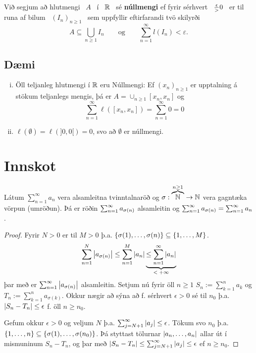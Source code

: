 \documentclass[12pt]{report}
\begin{document}
\begin{skgr*}
Við segjum að hlutmengi \ $A$ \ í \ $\mathbb{R}$ \ sé {\bf núllmengi} ef fyrir sérhvert \ $\frac{\epsilon} > 0$ \ er til runa af bilum \ $(I_n)_{n\geq 1}$ \ sem uppfyllir eftirfarandi tvö skilyrði
\[
A\subseteq\bigcup_{n\geq 1}I_n\qquad\text{og}\qquad \sum_{n=1}^{\infty}l(I_n) < \varepsilon.
\]
\end{skgr*}

\subsection{Dæmi}

\begin{daemi}
\begin{enumerate}[i)]
\item Öll teljanleg hlutmengi í $\mathbb{R}$ eru Núllmengi: Ef
  $(x_n)_{n \geq 1}$ er upptalning á stökum teljanlegs mengis, þá er
  $A = \cup_{n \geq 1} [x_n, x_n]$ og
  \[\sum_{n = 1}^{\infty} \ell([x_n,x_n]) = \sum_{n=1}^{\infty} 0 = 0\]
\item $\ell(\emptyset) = \ell(]0,0[) = 0$, svo að $\emptyset$ er
  núllmengi.
\end{enumerate}
\end{daemi}

\section*{Innskot}

\begin{setn}
  Látum $\sum_{n=1}^{\infty}a_n$ vera alsamleitna tvinntalnaröð og
  $\sigma: \overbrace{\mathbb{N}}^{n \geq 1} \to \mathbb{N}$ vera gagntæka vörpun
  (umröðun). Þá er röðin $\sum_{n = {1}}^{\infty} a_{\sigma(n)}$ alsamleitin og
  $\sum_{n = {1}}^{\infty} a_{\sigma(n)} = \sum_{n = 1}^{\infty} a_n$.
\end{setn}

\begin{proof}
  Fyrir $N > 0$ er til $M > 0$ þ.a.
  $\{\sigma(1), \dotsc, \sigma(n)\} \subseteq \{1, \dotsc, M\}$.
  \[\sum_{n=1}^{N} \left|a_{\sigma(n)}\right|
  \leq \sum_{n = 1}^M \left|a_n\right| \underbrace{\leq \sum_{n = {1}}^{\infty}
    \left|a_n\right|}_{\text{$< +\infty$}}
  \]
  þar með er $\sum_{n = 1}^{\infty} \left|a_{\sigma(n)}\right|$ alsamleitin.  Setjum nú
  fyrir öll $n \geq 1$ $S_n := \sum_{k=1}^n a_k$ og
  $T_n := \sum_{k=1}^n a_{\sigma(k)}$.  Okkur nægir að sýna að
  f. sérhvert $\epsilon > 0$ sé til $n_0$ þ.a.
  $\left|S_n - T_n\right| \leq \epsilon$ f. öll $n \geq n_0$.

  Gefum okkur $\epsilon > 0$ og veljum $N$ þ.a.
  $\sum_{j = N+1}^{\infty} \left|a_j\right| \leq \epsilon$. Tökum svo $n_0$
  þ.a.
  $ \{1, \dotsc, n\} \subseteq \{\sigma(1), \dotsc,
    \sigma(n_0)\}$.
  Þá styttast tölurnar $\left|a_n, \dotsc, a_n\right|$ allar út í mismuninum
  $S_n - T_n$, og þar með
  $\left|S_n - T_n\right| \leq \sum_{j = N+1}^{\infty} \left|a_j\right| \leq
  \epsilon$ ef $n \geq n_0$.
\end{proof}
\end{document}
